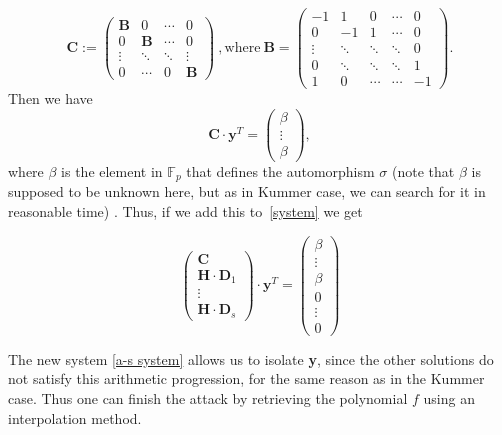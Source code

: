 \documentclass[10pt]{article}
\theoremstyle{definition}
\theoremstyle{definition}
\theoremstyle{definition}
\newcommand{\cd}{\cdot}
\begin{document}
\begin{equation*} 
\mathbf{C} := 
\begin{pmatrix}
\mathbf{B} & 0 & \cdots & 0 \\
0 & \mathbf{B} & \cdots & 0 \\
\vdots & \ddots & \ddots & \vdots \\
0 & \cdots & 0 & \mathbf{B}
\end{pmatrix} \ , \mathrm{where} \ 
\mathbf{B} = 
\begin{pmatrix}
-1 & 1 & 0 & \cdots & 0 \\
0 & -1 & 1 & \cdots & 0 \\
\vdots & \ddots & \ddots & \ddots & 0 \\
0 & \ddots & \ddots & \ddots & 1 \\
1 & 0 & \cdots & \cdots & -1
\end{pmatrix}.
\end{equation*}
Then we have
\begin{equation*}
\mathbf{C} \cd \textbf{y}^T
= 
\begin{pmatrix}
\beta \\
\vdots \\
\beta
\end{pmatrix},
\end{equation*}
where $\beta$ is the element in $\mathbb{F}_p$ that defines the automorphism $\sigma$ (note that $\beta$ is supposed to be unknown here, but as in Kummer case, we can search for it in reasonable time) . Thus, if we add this to~\eqref{system} we get

\begin{equation} \label{a-s system}
\begin{pmatrix}
\mathbf{C}\\
\mathbf{H} \cd \mathbf{D}_1 \\
\vdots \\
\mathbf{H} \cd \mathbf{D}_s
\end{pmatrix}
\cd \mathbf{y}^T = 
\begin{pmatrix}
\beta \\
\vdots \\
\beta \\
0 \\
\vdots \\
0
\end{pmatrix} 
\end{equation}

The new system \eqref{a-s system} allows us to isolate \textbf{y}, since the other solutions do not satisfy this arithmetic progression, for the same reason as in the Kummer case. Thus one can finish the attack by retrieving the polynomial $f$ using an interpolation method. 
\end{document}
